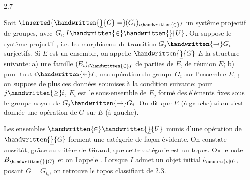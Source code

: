 2.7 

 Soit $\inserted{\handwritten{\underline}{G}=}(G_i)_{i\handwritten{\in}I}$ un systême projectif  de groupes, avec $G_i,I\handwritten{\in}\handwritten{\underline}{U}$. On suppose le systême projectif , i.e. les morphismes de transition $G_j\handwritten{\to}G_i$ surjectifs. Si $E$ est un ensemble, on   appelle  $\handwritten{\underline}{G}$  $E$ la structure suivante: a) une famille $(E_i)_{i\handwritten{\in}I}$ de parties de $E$, de réunion $E$; b) pour tout $i\handwritten{\in}I$, une opération du groupe $G_i$ sur l'ensemble $E_i$ ; on suppose de plus ces données soumises à la condition suivante: pour $j\handwritten{\geq}i$, $E_i$ est le sous-ensemble de $E_j$ formé des éléments fixes sous le groupe noyau de $G_j\handwritten{\to}G_i$. On dit  que  $E$ (à gauche) si on s'est donnée une opération de $G$ sur $E$ (à gauche).

Les ensembles $\handwritten{\in}\handwritten{\underline}{U}$ munis d'une opération de $\handwritten{\underline}{G}$ forment une catégorie de façon évidente. On constate aussitôt, grâce au critère de Giraud, que cette catégorie est un topos. On le note $B_{\handwritten{\underline}{G}}$ et on llappele . Lorsque $I$ admet un objet  initial $i_{\unsure{o|0}}$, posant $G=G_{i_o}$, on retrouve le topos classifiant de 2.3.

